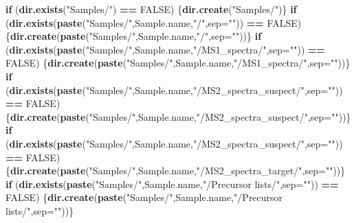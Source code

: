 \documentclass[]{article}
\newenvironment{Shaded}{\begin{snugshade}}{\end{snugshade}}
\newcommand{\KeywordTok}[1]{\textcolor[rgb]{0.13,0.29,0.53}{\textbf{#1}}}
\newcommand{\DataTypeTok}[1]{\textcolor[rgb]{0.13,0.29,0.53}{#1}}
\newcommand{\StringTok}[1]{\textcolor[rgb]{0.31,0.60,0.02}{#1}}
\newcommand{\OtherTok}[1]{\textcolor[rgb]{0.56,0.35,0.01}{#1}}
\newcommand{\ControlFlowTok}[1]{\textcolor[rgb]{0.13,0.29,0.53}{\textbf{#1}}}
\newcommand{\OperatorTok}[1]{\textcolor[rgb]{0.81,0.36,0.00}{\textbf{#1}}}
\newcommand{\NormalTok}[1]{#1}
\begin{document}
\begin{Shaded}
\begin{Highlighting}[]
\ControlFlowTok{if}\NormalTok{ (}\KeywordTok{dir.exists}\NormalTok{(}\StringTok{"Samples/"}\NormalTok{) }\OperatorTok{==}\StringTok{ }\OtherTok{FALSE}\NormalTok{) \{}\KeywordTok{dir.create}\NormalTok{(}\StringTok{"Samples/"}\NormalTok{)\}}
\ControlFlowTok{if}\NormalTok{ (}\KeywordTok{dir.exists}\NormalTok{(}\KeywordTok{paste}\NormalTok{(}\StringTok{"Samples/"}\NormalTok{,Sample.name,}\StringTok{"/"}\NormalTok{,}\DataTypeTok{sep=}\StringTok{""}\NormalTok{)) }\OperatorTok{==}\StringTok{ }\OtherTok{FALSE}\NormalTok{) \{}\KeywordTok{dir.create}\NormalTok{(}\KeywordTok{paste}\NormalTok{(}\StringTok{"Samples/"}\NormalTok{,Sample.name,}\StringTok{"/"}\NormalTok{,}\DataTypeTok{sep=}\StringTok{""}\NormalTok{))\}}
\ControlFlowTok{if}\NormalTok{ (}\KeywordTok{dir.exists}\NormalTok{(}\KeywordTok{paste}\NormalTok{(}\StringTok{"Samples/"}\NormalTok{,Sample.name,}\StringTok{"/MS1_spectra/"}\NormalTok{,}\DataTypeTok{sep=}\StringTok{""}\NormalTok{)) }\OperatorTok{==}\StringTok{ }\OtherTok{FALSE}\NormalTok{) \{}\KeywordTok{dir.create}\NormalTok{(}\KeywordTok{paste}\NormalTok{(}\StringTok{"Samples/"}\NormalTok{,Sample.name,}\StringTok{"/MS1_spectra/"}\NormalTok{,}\DataTypeTok{sep=}\StringTok{""}\NormalTok{))\}}
\ControlFlowTok{if}\NormalTok{ (}\KeywordTok{dir.exists}\NormalTok{(}\KeywordTok{paste}\NormalTok{(}\StringTok{"Samples/"}\NormalTok{,Sample.name,}\StringTok{"/MS2_spectra_suspect/"}\NormalTok{,}\DataTypeTok{sep=}\StringTok{""}\NormalTok{)) }\OperatorTok{==}\StringTok{ }\OtherTok{FALSE}\NormalTok{) \{}\KeywordTok{dir.create}\NormalTok{(}\KeywordTok{paste}\NormalTok{(}\StringTok{"Samples/"}\NormalTok{,Sample.name,}\StringTok{"/MS2_spectra_suspect/"}\NormalTok{,}\DataTypeTok{sep=}\StringTok{""}\NormalTok{))\}}
\ControlFlowTok{if}\NormalTok{ (}\KeywordTok{dir.exists}\NormalTok{(}\KeywordTok{paste}\NormalTok{(}\StringTok{"Samples/"}\NormalTok{,Sample.name,}\StringTok{"/MS2_spectra_suspect/"}\NormalTok{,}\DataTypeTok{sep=}\StringTok{""}\NormalTok{)) }\OperatorTok{==}\StringTok{ }\OtherTok{FALSE}\NormalTok{) \{}\KeywordTok{dir.create}\NormalTok{(}\KeywordTok{paste}\NormalTok{(}\StringTok{"Samples/"}\NormalTok{,Sample.name,}\StringTok{"/MS2_spectra_target/"}\NormalTok{,}\DataTypeTok{sep=}\StringTok{""}\NormalTok{))\}}
\ControlFlowTok{if}\NormalTok{ (}\KeywordTok{dir.exists}\NormalTok{(}\KeywordTok{paste}\NormalTok{(}\StringTok{"Samples/"}\NormalTok{,Sample.name,}\StringTok{"/Precursor lists/"}\NormalTok{,}\DataTypeTok{sep=}\StringTok{""}\NormalTok{)) }\OperatorTok{==}\StringTok{ }\OtherTok{FALSE}\NormalTok{) \{}\KeywordTok{dir.create}\NormalTok{(}\KeywordTok{paste}\NormalTok{(}\StringTok{"Samples/"}\NormalTok{,Sample.name,}\StringTok{"/Precursor lists/"}\NormalTok{,}\DataTypeTok{sep=}\StringTok{""}\NormalTok{))\}}

\end{Highlighting}
\end{Shaded}
\end{document}
